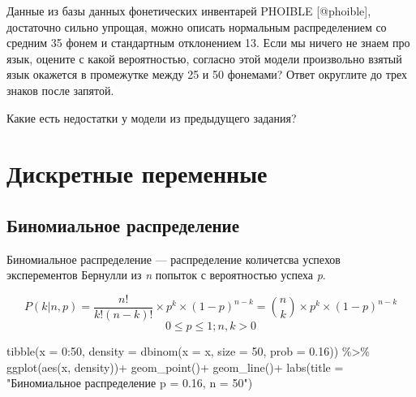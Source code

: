 \documentclass[
]{book}
\makeatletter
\newenvironment{Shaded}{\begin{snugshade}}{\end{snugshade}}
\newcommand{\AttributeTok}[1]{\textcolor[rgb]{0.77,0.63,0.00}{#1}}
\newcommand{\DecValTok}[1]{\textcolor[rgb]{0.00,0.00,0.81}{#1}}
\newcommand{\FloatTok}[1]{\textcolor[rgb]{0.00,0.00,0.81}{#1}}
\newcommand{\FunctionTok}[1]{\textcolor[rgb]{0.00,0.00,0.00}{#1}}
\newcommand{\NormalTok}[1]{#1}
\newcommand{\SpecialCharTok}[1]{\textcolor[rgb]{0.00,0.00,0.00}{#1}}
\newcommand{\StringTok}[1]{\textcolor[rgb]{0.31,0.60,0.02}{#1}}
\newenvironment{kframe}{%
    \medskip{}
    \setlength{\fboxsep}{.8em}
    \def\at@end@of@kframe{}%
    \ifinner\ifhmode%
    \def\at@end@of@kframe{\end{minipage}}%
    \begin{minipage}{\columnwidth}%
    \fi\fi%
    \def\FrameCommand##1{\hskip\@totalleftmargin \hskip-\fboxsep
    \colorbox{shadecolor}{##1}\hskip-\fboxsep
        \hskip-\linewidth \hskip-\@totalleftmargin \hskip\columnwidth}%
    \MakeFramed {\advance\hsize-\width
      \@totalleftmargin\z@ \linewidth\hsize
      \@setminipage}}%
  {\par\unskip\endMakeFramed%
    \at@end@of@kframe}
\newenvironment{rmdblock}[1]
  {
    \begin{itemize}
    \renewcommand{\labelitemi}{
      \raisebox{-.7\height}[0pt][0pt]{
        {\setkeys{Gin}{width=3em,keepaspectratio}\texttt{[image: images/\#1]}}
        }
        }
        \setlength{\fboxsep}{1em}
        \begin{kframe}
        \item
      }
      {
        \end{kframe}
        \end{itemize}
      }
\newenvironment{rmdtask}
      {\begin{rmdblock}{task}}
      {\end{rmdblock}}
\makeatother
\begin{document}
\begin{rmdtask}
Данные из базы данных фонетических инвентарей PHOIBLE {[}@phoible{]},
достаточно сильно упрощая, можно описать нормальным распределением со
средним 35 фонем и стандартным отклонением 13. Если мы ничего не знаем
про язык, оцените с какой вероятностью, согласно этой модели произвольно
взятый язык окажется в промежутке между 25 и 50 фонемами? Ответ
округлите до трех знаков после запятой.
\end{rmdtask}

\begin{rmdtask}
Какие есть недостатки у модели из предыдущего задания?
\end{rmdtask}

\hypertarget{ux434ux438ux441ux43aux440ux435ux442ux43dux44bux435-ux43fux435ux440ux435ux43cux435ux43dux43dux44bux435}{%
\section{Дискретные переменные}\label{ux434ux438ux441ux43aux440ux435ux442ux43dux44bux435-ux43fux435ux440ux435ux43cux435ux43dux43dux44bux435}}

\hypertarget{ux431ux438ux43dux43eux43cux438ux430ux43bux44cux43dux43eux435-ux440ux430ux441ux43fux440ux435ux434ux435ux43bux435ux43dux438ux435}{%
\subsection{Биномиальное распределение}\label{ux431ux438ux43dux43eux43cux438ux430ux43bux44cux43dux43eux435-ux440ux430ux441ux43fux440ux435ux434ux435ux43bux435ux43dux438ux435}}

Биномиальное распределение --- распределение количетсва успехов эксперементов Бернулли из \emph{n} попыток с вероятностью успеха \emph{p}.

\[P(k | n, p) = \frac{n!}{k!(n-k)!} \times p^k \times (1-p)^{n-k} =  {n \choose k} \times p^k \times (1-p)^{n-k}\]
\[ 0 \leq p \leq 1; n, k > 0\]

\begin{Shaded}
\begin{Highlighting}[]
\FunctionTok{tibble}\NormalTok{(}\AttributeTok{x =} \DecValTok{0}\SpecialCharTok{:}\DecValTok{50}\NormalTok{,}
       \AttributeTok{density =} \FunctionTok{dbinom}\NormalTok{(}\AttributeTok{x =}\NormalTok{ x, }\AttributeTok{size =} \DecValTok{50}\NormalTok{, }\AttributeTok{prob =} \FloatTok{0.16}\NormalTok{)) }\SpecialCharTok{\%\textgreater{}\%} 
  \FunctionTok{ggplot}\NormalTok{(}\FunctionTok{aes}\NormalTok{(x, density))}\SpecialCharTok{+}
  \FunctionTok{geom\_point}\NormalTok{()}\SpecialCharTok{+}
  \FunctionTok{geom\_line}\NormalTok{()}\SpecialCharTok{+}
  \FunctionTok{labs}\NormalTok{(}\AttributeTok{title =} \StringTok{"Биномиальное распределение p = 0.16, n = 50"}\NormalTok{)}
\end{Highlighting}
\end{Shaded}
\end{document}
